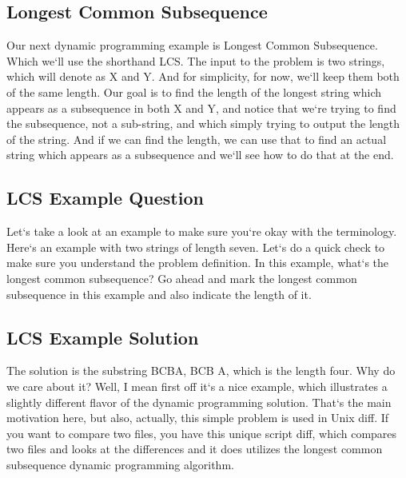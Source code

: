\subsection{Longest Common Subsequence}
Our next dynamic programming example is Longest Common Subsequence.
Which we`ll use the shorthand LCS\@.
The input to the problem is two strings, which will denote as X and Y\@.
And for simplicity, for now, we`ll keep them both of the same length.
Our goal is to find the length of the longest string which appears as a subsequence in both X and Y, and notice that we`re trying to find the subsequence, not a sub-string, and which simply trying to output the length of the string.
And if we can find the length, we can use that to find an actual string which appears as a subsequence and we`ll see how to do that at the end.

\subsection{LCS Example Question}
Let`s take a look at an example to make sure you`re okay with the terminology.
Here`s an example with two strings of length seven.
Let`s do a quick check to make sure you understand the problem definition.
In this example, what`s the longest common subsequence? Go ahead and mark the longest common subsequence in this example and also indicate the length of it.

\subsection{LCS Example Solution}
The solution is the substring BCBA, BCB A, which is the length four.
Why do we care about it? Well, I mean first off it`s a nice example, which illustrates a slightly different flavor of the dynamic programming solution.
That`s the main motivation here, but also, actually, this simple problem is used in Unix diff.
If you want to compare two files, you have this unique script diff, which compares two files and looks at the differences and it does utilizes the longest common subsequence dynamic programming algorithm.

